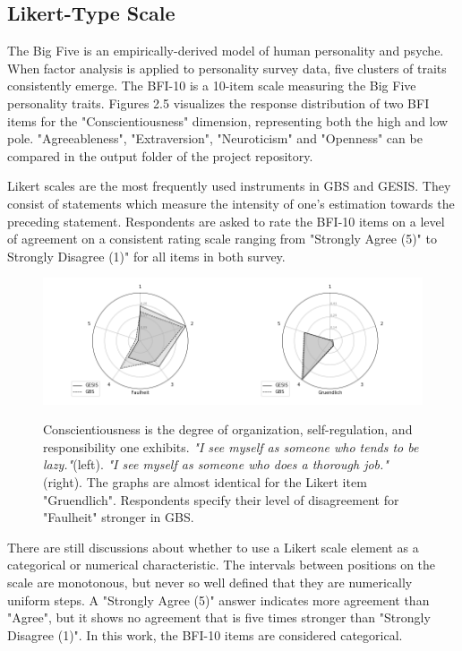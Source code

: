 \subsection{Likert-Type Scale}

The Big Five is an empirically-derived model of human personality and psyche. When factor analysis is applied to personality survey data, five clusters of traits consistently emerge. The BFI-10 is a 10-item scale measuring the Big Five personality traits. Figures 2.5 visualizes the response distribution of two BFI items for the "Conscientiousness" dimension, representing both the high and low pole. "Agreeableness", "Extraversion", "Neuroticism" and "Openness" can be compared in the output folder of the project repository. 

Likert scales are the most frequently used instruments in GBS and GESIS. They consist of statements which measure the intensity of one's estimation towards the preceding statement. Respondents are asked to rate the BFI-10 items on a level of agreement on a consistent rating scale ranging from "Strongly Agree (5)" to Strongly Disagree (1)" for all items in both survey. 

\begin{figure}[H]
	\begin{center}
		\includegraphics[scale=0.52,angle=0]{fig/Conscientiousness_figure}
		\label{Conscientiousness}
		\caption{Conscientiousness is the degree of organization, self-regulation, and responsibility one exhibits. \textit{"I see myself as someone who tends to be lazy."}(left). \textit{"I see myself as someone who does a thorough job."}(right). The graphs are almost identical for the Likert item "Gruendlich". Respondents specify their level of disagreement for "Faulheit" stronger in GBS.}
	\end{center}
\end{figure}

There are still discussions about whether to use a Likert scale element as a categorical or numerical characteristic. The intervals between positions on the scale are monotonous, but never so well defined that they are numerically uniform steps. A "Strongly Agree (5)" answer indicates more agreement than "Agree", but it shows no agreement that is five times stronger than "Strongly Disagree (1)". In this work, the BFI-10 items are considered categorical.

